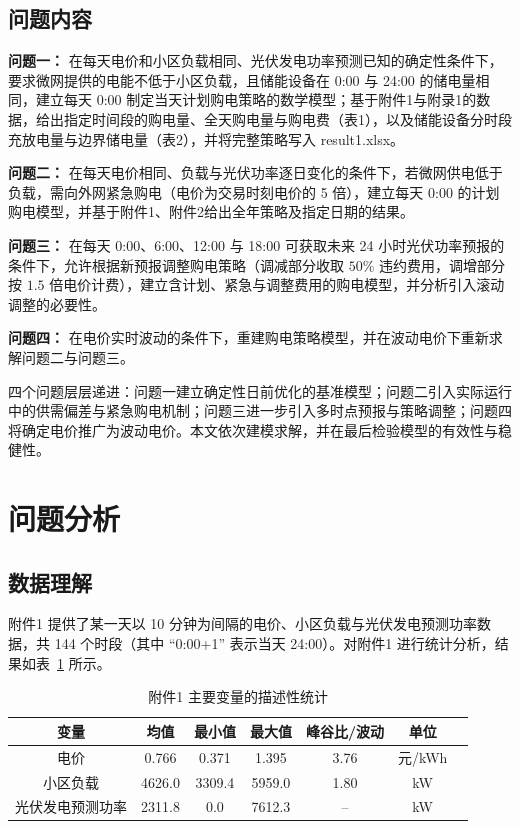 \documentclass[zihao=-4,a4paper,UTF8,fontset=none]{ctexart}
\begin{document}
\subsection{问题内容}

\textbf{问题一：} 在每天电价和小区负载相同、光伏发电功率预测已知的确定性条件下，要求微网提供的电能不低于小区负载，且储能设备在 0:00 与 24:00 的储电量相同，建立每天 0:00 制定当天计划购电策略的数学模型；基于附件1与附录1的数据，给出指定时间段的购电量、全天购电量与购电费（表1），以及储能设备分时段充放电量与边界储电量（表2），并将完整策略写入 result1.xlsx。

\textbf{问题二：} 在每天电价相同、负载与光伏功率逐日变化的条件下，若微网供电低于负载，需向外网紧急购电（电价为交易时刻电价的 5 倍），建立每天 0:00 的计划购电模型，并基于附件1、附件2给出全年策略及指定日期的结果。

\textbf{问题三：} 在每天 0:00、6:00、12:00 与 18:00 可获取未来 24 小时光伏功率预报的条件下，允许根据新预报调整购电策略（调减部分收取 $50\%$ 违约费用，调增部分按 $1.5$ 倍电价计费），建立含计划、紧急与调整费用的购电模型，并分析引入滚动调整的必要性。

\textbf{问题四：} 在电价实时波动的条件下，重建购电策略模型，并在波动电价下重新求解问题二与问题三。

四个问题层层递进：问题一建立确定性日前优化的基准模型；问题二引入实际运行中的供需偏差与紧急购电机制；问题三进一步引入多时点预报与策略调整；问题四将确定电价推广为波动电价。本文依次建模求解，并在最后检验模型的有效性与稳健性。

\section{问题分析}

\subsection{数据理解}

附件1 提供了某一天以 10 分钟为间隔的电价、小区负载与光伏发电预测功率数据，共 144 个时段（其中 ``0:00+1'' 表示当天 24:00）。对附件1 进行统计分析，结果如表~\ref{tab:data_stat} 所示。

\begin{table}[H]
  \centering
  \caption{附件1 主要变量的描述性统计}
  \label{tab:data_stat}
  \begin{tabular}{ccccccc}
    \toprule
    变量 & 均值 & 最小值 & 最大值 & 峰谷比/波动 & 单位 \\
    \midrule
    电价 & 0.766 & 0.371 & 1.395 & 3.76 & 元/kWh \\
    小区负载 & 4626.0 & 3309.4 & 5959.0 & 1.80 & kW \\
    光伏发电预测功率 & 2311.8 & 0.0 & 7612.3 & -- & kW \\
    \bottomrule
  \end{tabular}
\end{table}
\end{document}
